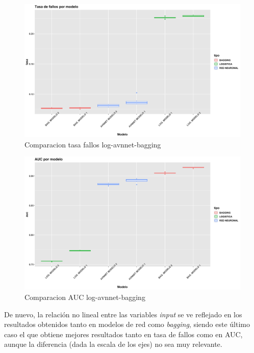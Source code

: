 \documentclass[
]{article}
\begin{document}
\begin{figure}[h!]

{\centering \includegraphics[width=0.99\linewidth,height=0.99\textheight,]{./charts/comparativas/03_log_avnnet_bagging_tasa} 

}

\caption{Comparacion tasa fallos log-avnnet-bagging}\label{fig:unnamed-chunk-83}
\end{figure}
\begin{figure}[h!]

{\centering \includegraphics[width=0.99\linewidth,height=0.99\textheight,]{./charts/comparativas/03_log_avnnet_bagging_auc} 

}

\caption{Comparacion AUC log-avnnet-bagging}\label{fig:unnamed-chunk-84}
\end{figure}

De nuevo, la relación no lineal entre las variables \emph{input} se ve
reflejado en los resultados obtenidos tanto en modelos de red como
\emph{bagging}, siendo este último caso el que obtiene mejores
resultados tanto en tasa de fallos como en AUC, aunque la diferencia
(dada la escala de los ejes) no sea muy relevante.
\end{document}
